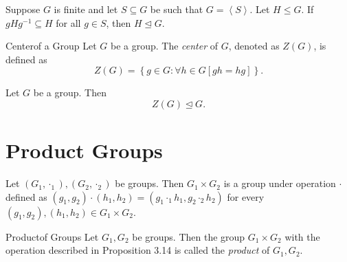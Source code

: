 \documentclass[pmath347]{subfiles}
\begin{document}
    \begin{cor}{}
        Suppose $G$ is finite and let $S\subseteq G$ be such that $G=\left< S \right>$. Let $H\leq G$. If $gHg^{-1} \subseteq H$ for all $g\in S$, then $H\trianglelefteq G$. 
    \end{cor}	

    \begin{definition}{Center}{of a Group}
        Let $G$ be a group. The \emph{center} of $G$, denoted as $Z\left( G \right)$, is defined as
        \begin{equation*}
            Z\left( G \right) = \left\lbrace g\in G: \forall h\in G\left[ gh=hg \right]  \right\rbrace .
        \end{equation*}
    \end{definition}

    \begin{prop}{}
        Let $G$ be a group. Then
        \begin{equation*}
            Z\left( G \right) \trianglelefteq G.
        \end{equation*}
    \end{prop}

    \section{Product Groups}
    
    \begin{prop}{}
        Let $\left( G_1,\cdot_1 \right) , \left( G_2,\cdot_2 \right)$ be groups. Then $G_1\times G_2$ is a group under operation $\cdot$ defined as $\left( g_1,g_2 \right) \cdot \left( h_1,h_2 \right) = \left( g_1\cdot_1 h_1, g_2\cdot_2 h_2 \right)$ for every $\left( g_1,g_2 \right) , \left( h_1,h_2 \right) \in G_1\times G_2$.
    \end{prop}

    \begin{definition}{Product}{of Groups}
        Let $G_1,G_2$ be groups. Then the group $G_1\times G_2$ with the operation described in Proposition 3.14 is called the \emph{product} of $G_1,G_2$.
    \end{definition}
\end{document}
